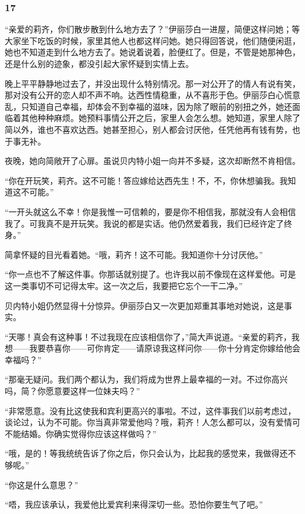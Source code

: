 \subsubsection*{17}


\par “亲爱的莉齐，你们散步散到什么地方去了？”伊丽莎白一进屋，简便这样问她；等大家坐下吃饭的时候，家里其他人也都这样问她。她只得回答说，他们随便闲逛，她也不知道走到什么地方去了。她说着说着，脸便红了。但是，不管是她那神色，还是什么别的迹象，都没引起大家怀疑到实情上去。
\par 晚上平平静静地过去了，并没出现什么特别情况。那一对公开了的情人有说有笑，那对没有公开的恋人却不声不响。达西性情稳重，从不喜形于色。伊丽莎白心慌意乱，只知道自己幸福，却体会不到幸福的滋味，因为除了眼前的别扭之外，她还面临着其他种种麻烦。她预料事情公开之后，家里人会怎么想。她知道，家里人除了简以外，谁也不喜欢达西。她甚至担心，别人都会讨厌他，任凭他再有钱有势，也于事无补。
\par 夜晚，她向简敞开了心扉。虽说贝内特小姐一向并不多疑，这次却断然不肯相信。
\par “你在开玩笑，莉齐。这不可能！答应嫁给达西先生！不，不，你休想骗我。我知道这不可能。”
\par “一开头就这么不幸！你是我惟一可信赖的，要是你不相信我，那就没有人会相信我了。可我真不是开玩笑。我说的都是实话。他仍然爱着我，我们已经许定了终身。”
\par 简拿怀疑的目光看着她。“哦，莉齐！这不可能。我知道你十分讨厌他。”
\par “你一点也不了解这件事。你那话就别提了。也许我以前不像现在这样爱他。可是这一类事切不可记得太牢。这一次之后，我要把它忘个一干二净。”
\par 贝内特小姐仍然显得十分惊异。伊丽莎白又一次更加郑重其事地对她说，这是事实。
\par “天哪！真会有这种事！不过我现在应该相信你了，”简大声说道。“亲爱的莉齐，我想——我要恭喜你——可你肯定——请原谅我这样问你——你十分肯定你嫁给他会幸福吗？”
\par “那毫无疑问。我们两个都认为，我们将成为世界上最幸福的一对。不过你高兴吗，简？你愿意要这样一位妹夫吗？”
\par “非常愿意。没有比这使我和宾利更高兴的事啦。不过，这件事我们以前考虑过，谈论过，认为不可能。你当真非常爱他吗？哦，莉齐！人怎么都可以，没有爱情可不能结婚。你确实觉得你应该这样做吗？”
\par “哦，是的！等我统统告诉了你之后，你只会认为，比起我的感觉来，我做得还不够呢。”
\par “你这是什么意思？”
\par “唔，我应该承认，我爱他比爱宾利来得深切一些。恐怕你要生气了吧。”
